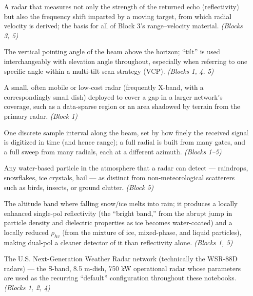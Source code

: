 \documentclass[11pt]{article}
\begin{document}
\begin{description}[leftmargin=2.4cm,style=nextline]
\item[Doppler radar] A radar that measures not only the strength of the returned echo (reflectivity) but also the frequency shift imparted by a moving target, from which radial velocity is derived; the basis for all of Block 3's range--velocity material. \emph{(Blocks 3, 5)}

\item[Elevation angle / tilt] The vertical pointing angle of the beam above the horizon; ``tilt'' is used interchangeably with elevation angle throughout, especially when referring to one specific angle within a multi-tilt scan strategy (VCP). \emph{(Blocks 1, 4, 5)}

\item[Gap-filler radar] A small, often mobile or low-cost radar (frequently X-band, with a correspondingly small dish) deployed to cover a gap in a larger network's coverage, such as a data-sparse region or an area shadowed by terrain from the primary radar. \emph{(Block 1)}

\item[Gate (range gate)] One discrete sample interval along the beam, set by how finely the received signal is digitized in time (and hence range); a full radial is built from many gates, and a full sweep from many radials, each at a different azimuth. \emph{(Blocks 1--5)}

\item[Hydrometeor] Any water-based particle in the atmosphere that a radar can detect --- raindrops, snowflakes, ice crystals, hail --- as distinct from non-meteorological scatterers such as birds, insects, or ground clutter. \emph{(Block 5)}

\item[Melting layer (bright band)] The altitude band where falling snow/ice melts into rain; it produces a locally enhanced single-pol reflectivity (the ``bright band,'' from the abrupt jump in particle density and dielectric properties as ice becomes water-coated) and a locally reduced $\rho_{hv}$ (from the mixture of ice, mixed-phase, and liquid particles), making dual-pol a cleaner detector of it than reflectivity alone. \emph{(Blocks 1, 5)}

\item[NEXRAD] The U.S. Next-Generation Weather Radar network (technically the WSR-88D radars) --- the S-band, 8.5 m-dish, 750 kW operational radar whose parameters are used as the recurring ``default'' configuration throughout these notebooks. \emph{(Blocks 1, 2, 4)}


\end{description}
\end{document}
